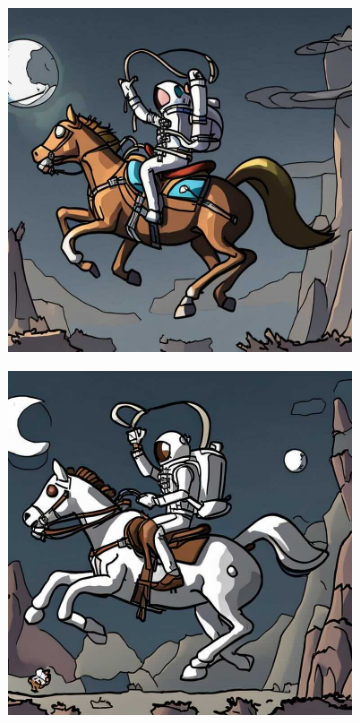 \documentclass{article}
\begin{document}
\begin{figure}[h]
\begin{subfigure}[b]{0.24\textwidth}
         \includegraphics[width=\textwidth]{plots/process/generations/clean/2.jpeg}
     \end{subfigure}
     \hfill
     \begin{subfigure}[b]{0.24\textwidth}
         \centering
         \includegraphics[width=\textwidth]{plots/process/generations/clean/3.jpeg}

\end{subfigure}
\end{figure}
\end{document}
